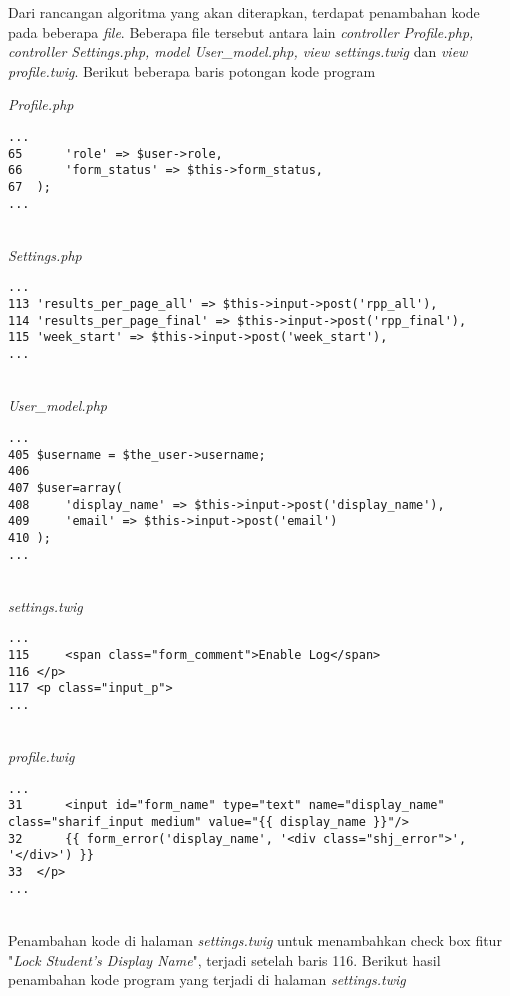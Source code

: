 Dari rancangan algoritma yang akan diterapkan, terdapat penambahan kode pada beberapa \textit{file}. Beberapa file tersebut antara lain \textit{controller Profile.php, controller Settings.php, model User\_model.php, view settings.twig} dan \textit{view profile.twig}.
Berikut beberapa baris potongan kode program

\textit{Profile.php}
\begin{lstlisting}[basicstyle=\ttfamily, frame=single,
columns=fullflexible, keepspaces=true, breaklines=true]
...
65		'role' => $user->role,
66		'form_status' => $this->form_status,
67	);
...
\end{lstlisting}
~\\
\textit{Settings.php}
\begin{lstlisting}[basicstyle=\ttfamily, frame=single,
columns=fullflexible, keepspaces=true, breaklines=true]
...
113	'results_per_page_all' => $this->input->post('rpp_all'),
114	'results_per_page_final' => $this->input->post('rpp_final'),
115	'week_start' => $this->input->post('week_start'),
...
\end{lstlisting}
~\\
\textit{User\_model.php}
\begin{lstlisting}[basicstyle=\ttfamily, frame=single,
columns=fullflexible, keepspaces=true, breaklines=true]
...
405	$username = $the_user->username;
406
407	$user=array(
408		'display_name' => $this->input->post('display_name'),
409		'email' => $this->input->post('email')
410	);
...
\end{lstlisting}
~\\
\textit{settings.twig}
\begin{lstlisting}[basicstyle=\ttfamily, frame=single,
columns=fullflexible, keepspaces=true, breaklines=true]
...
115		<span class="form_comment">Enable Log</span>
116	</p>
117	<p class="input_p">
...
\end{lstlisting}
~\\
\textit{profile.twig}
\begin{lstlisting}[basicstyle=\ttfamily, frame=single,
columns=fullflexible, keepspaces=true, breaklines=true]
...
31		<input id="form_name" type="text" name="display_name" class="sharif_input medium" value="{{ display_name }}"/>
32		{{ form_error('display_name', '<div class="shj_error">', '</div>') }}
33	</p>
...
\end{lstlisting}
~\\
Penambahan kode di halaman \textit{settings.twig} untuk menambahkan check box fitur "\textit{Lock Student's Display Name}", terjadi setelah baris 116. Berikut hasil penambahan kode program yang terjadi di halaman \textit{settings.twig}
